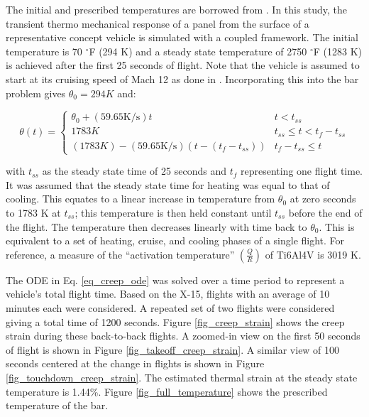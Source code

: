 \documentclass[conf]{new-aiaa}
\begin{document}
The initial and prescribed temperatures are borrowed from 
\cite{ culler_impact_of_FTS_coupling_on_response_prediction_hypersonic_skin_panels}.
In this study, the transient thermo mechanical response of a panel from the 
surface of a representative concept vehicle is simulated with a coupled framework.
The initial temperature is 70 $^{\circ}$F (294 K) and a steady state temperature 
of 2750 $^{\circ}$F (1283 K) is achieved after the first 25 seconds of flight.
Note that the vehicle is assumed to start at its cruising speed of Mach 12
as done in \cite{ culler_impact_of_FTS_coupling_on_response_prediction_hypersonic_skin_panels}.
Incorporating this into the bar problem
gives $\theta_0 = 294 K$ and:

\begin{equation}
\theta(t) = \begin{cases}
 \theta_0 + (59.65 \text{K/s})t                & t < t_{ss} \\
1783 K                                         & t_{ss} \leq t < t_f-t_{ss} \\
(1783 K) - (59.65 \text{K/s})(t-(t_f-t_{ss}))  & t_f - t_{ss} \leq t
\end{cases}
\end{equation}

\noindent
with $t_{ss}$ as the steady state time of 25 seconds
and $t_f$ representing one flight time.
It was assumed that the steady state time for heating was
equal to that of cooling.
This equates to a linear increase in temperature from 
$\theta_0$ at zero seconds to 1783 K at $t_{ss}$;
this temperature is then held constant until $t_{ss}$ before
the end of the flight.
The temperature then decreases linearly with time back to $\theta_0$.
This is equivalent to a set of heating, cruise, and cooling phases of a single flight.
For reference, a measure of the ``activation temperature'' 
$\left(\frac{Q}{R}\right)$ of Ti6Al4V is 3019 K.

The ODE in Eq. \ref{eq_creep_ode} was solved over a time period to represent a
vehicle's total flight time.
Based on the X-15, flights with an average of 10 minutes each 
\cite{ kordes_structureal_heating_experiencs_on_the_x15_airplane}
were considered.
A repeated set of two flights were considered giving a total time of 1200 seconds.
Figure \ref{fig_creep_strain} shows
the creep strain during these back-to-back flights.
A zoomed-in view on the first 50 seconds of flight is shown 
in Figure \ref{fig_takeoff_creep_strain}.
A similar view of 100 seconds centered at the change in flights is 
shown in Figure \ref{fig_touchdown_creep_strain}.
The estimated thermal strain at the steady state temperature is 1.44\%.
Figure \ref{fig_full_temperature} shows the prescribed temperature of the bar.
\end{document}
